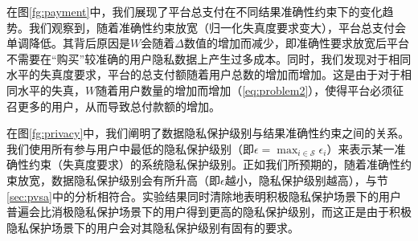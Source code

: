 	在图\ref{fg:payment}中，我们展现了平台总支付在不同结果准确性约束下的变化趋势。我们观察到，随着准确性约束放宽（归一化失真度要求变大），平台总支付会单调降低。其背后原因是$W$会随着$\Delta$数值的增加而减少，即准确性要求放宽后平台不需要在“购买”较准确的用户隐私数据上产生过多成本。同时，我们发现对于相同水平的失真度要求，平台的总支付额随着用户总数的增加而增加。这是由于对于相同水平的失真，$W$随着用户数量的增加而增加（\ref{eq:problem2}），使得平台必须征召更多的用户，从而导致总付款额的增加。
	
	
	在图\ref{fg:privacy}中，我们阐明了数据隐私保护级别与结果准确性约束之间的关系。我们使用所有参与用户中最低的隐私保护级别（即$\epsilon=\max_{i\in\mathcal{S}}\epsilon_i$）来表示某一准确性约束（失真度要求）的系统隐私保护级别。正如我们所预期的，随着准确性约束放宽，数据隐私保护级别会有所升高（即$\epsilon$越小，隐私保护级别越高），与节\ref{sec:pvsa}中的分析相符合。实验结果同时清除地表明积极隐私保护场景下的用户普遍会比消极隐私保护场景下的用户得到更高的隐私保护级别，而这正是由于积极隐私保护场景下的用户会对其隐私保护级别有固有的要求。
	
